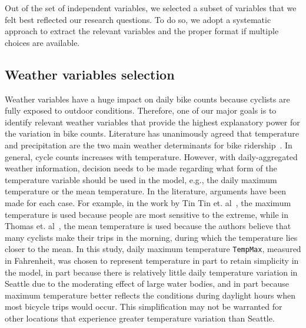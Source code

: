 \documentclass [11pt, proquest] {uwthesis}[2015/03/03]
\begin{document}
Out of the set of independent variables, we selected a subset of variables that we felt best reflected our research questions. To do so, we adopt a systematic approach to extract the relevant variables and the proper format if multiple choices are available.

\subsection{Weather variables selection}
Weather variables have a huge impact on daily bike counts because cyclists are fully exposed to outdoor conditions. Therefore, one of our major goals is to identify relevant weather variables that provide the highest explanatory power for the variation in bike counts. Literature has unanimously agreed that temperature and precipitation are the two main weather determinants for bike ridership~\cite{Nosal:2014aa,Tin:2012aa}. In general, cycle counts increases with temperature. However, with daily-aggregated weather information, decision needs to be made regarding what form of the temperature variable should be used in the model, e.g., the daily maximum temperature or the mean temperature. In the literature, arguments have been made for each case. For example, in the work by Tin Tin et. al~\cite{Tin:2012aa}, the maximum temperature is used because people are most sensitive to the extreme, while in Thomas et. al~\cite{Thomas09}, the mean temperature is used because the authors believe that many cyclists make their trips in the morning, during which the temperature lies closer to the mean. In this study, daily maximum temperature \texttt{TempMax}, measured in Fahrenheit, was chosen to represent temperature in part to retain simplicity in the model, in part because there is relatively little daily temperature variation in Seattle due to the moderating effect of large water bodies, and in part because maximum temperature better reflects the conditions during daylight hours when most bicycle trips would occur. This simplification may not be warranted for other locations that experience greater temperature variation than Seattle. 
\end{document}
